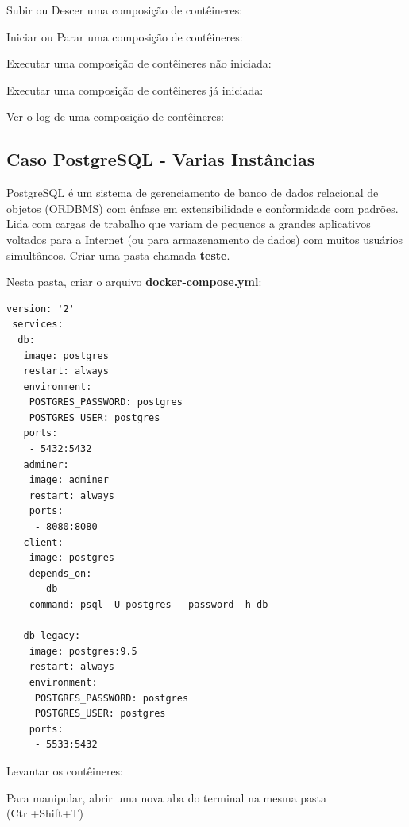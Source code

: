 \documentclass[a4paper,11pt]{article}
\begin{document}
Subir ou Descer uma composição de contêineres: \\

Iniciar ou Parar uma composição de contêineres: \\

Executar uma composição de contêineres não iniciada: \\

Executar uma composição de contêineres já iniciada: \\

Ver o log de uma composição de contêineres: \\

\subsection{Caso PostgreSQL - Varias Instâncias}
PostgreSQL é um sistema de gerenciamento de banco de dados relacional de objetos (ORDBMS) com ênfase em extensibilidade e conformidade com padrões. Lida com cargas de trabalho que variam de pequenos a grandes aplicativos voltados para a Internet (ou para armazenamento de dados) com muitos usuários simultâneos. Criar uma pasta chamada \textbf{teste}.

Nesta pasta, criar o arquivo \textbf{docker-compose.yml}:
\begin{lstlisting}
version: '2'
 services:
  db:
   image: postgres
   restart: always
   environment:
    POSTGRES_PASSWORD: postgres
    POSTGRES_USER: postgres
   ports:
    - 5432:5432
   adminer:
    image: adminer
    restart: always
    ports:
     - 8080:8080
   client:
    image: postgres
    depends_on:
     - db
    command: psql -U postgres --password -h db
    
   db-legacy:
    image: postgres:9.5
    restart: always
    environment:
     POSTGRES_PASSWORD: postgres
     POSTGRES_USER: postgres
    ports:
     - 5533:5432
\end{lstlisting}
Levantar os contêineres: \\

Para manipular, abrir uma nova aba do terminal na mesma pasta (Ctrl+Shift+T) \\
\end{document}
